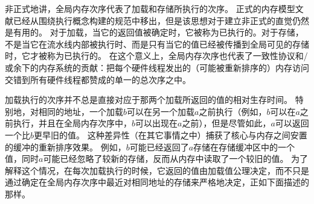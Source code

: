 非正式地讲，全局内存次序代表了加载和存储所执行的次序。
正式的内存模型文献已经从围绕执行概念构建的规范中移出，但是该思想对于建立非正式的直觉仍然是有用的。
对于加载，当它的返回值被确定时，它被称为已执行的。对于存储，不是当它在流水线内部被执行时、而是只有当它的值已经被传播到全局可见的存储时，它才被称为已执行的。
在这个意义上，全局内存次序也代表了一致性协议和/或余下的内存系统的贡献：把每个硬件线程发出的（可能被重新排序的）内存访问交错到所有硬件线程都赞成的单一的总次序之中。

加载执行的次序并不总是直接对应于那两个加载所返回的值的相对生存时间。
特别地，对相同的地址，一个加载$b$可以在另一个加载$a$之前执行（例如，$b$可以在$a$之前执行，并且在全局内存次序中，$b$可以出现在$a$之前），但是尽管如此，$a$可以返回一个比$b$更早旧的值。
这种差异性（在其它事情之中）捕获了核心与内存之间安置的缓冲的重新排序效果。
例如，$b$可能已经返回了$a$存储在存储缓冲区中的一个值，同时$a$可能已经忽略了较新的存储，反而从内存中读取了一个较旧的值。
为了解释这个情况，在每次加载执行的时候，它返回的值由加载值公理决定，而不只是通过确定在全局内存次序中最近对相同地址的存储来严格地决定，正如下面描述的那样。

